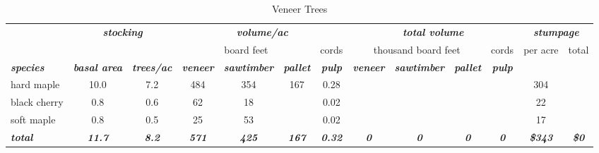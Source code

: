 \documentclass[landscape]{article}
\begin{document}
\begin{table}[H]

\caption{\label{tab:unnamed-chunk-18}Veneer Trees}
\fontsize{10}{12}\selectfont
\begin{tabular}[t]{lcccccccccccc}
\toprule
\multicolumn{1}{c}{\em{\textbf{ }}} & \multicolumn{2}{c}{\em{\textbf{stocking}}} & \multicolumn{4}{c}{\em{\textbf{volume/ac }}} & \multicolumn{4}{c}{\em{\textbf{total volume}}} & \multicolumn{2}{c}{\em{\textbf{stumpage}}} \\
\cmidrule(l{3pt}r{3pt}){2-3} \cmidrule(l{3pt}r{3pt}){4-7} \cmidrule(l{3pt}r{3pt}){8-11} \cmidrule(l{3pt}r{3pt}){12-13}
\multicolumn{3}{c}{ } & \multicolumn{3}{c}{board feet} & \multicolumn{1}{c}{cords} & \multicolumn{3}{c}{thousand board feet} & \multicolumn{1}{c}{cords} & \multicolumn{1}{c}{per acre} & \multicolumn{1}{c}{total} \\
\cmidrule(l{3pt}r{3pt}){4-6} \cmidrule(l{3pt}r{3pt}){7-7} \cmidrule(l{3pt}r{3pt}){8-10} \cmidrule(l{3pt}r{3pt}){11-11} \cmidrule(l{3pt}r{3pt}){12-12} \cmidrule(l{3pt}r{3pt}){13-13}
\rowcolor[HTML]{DCDCDC}  \em{\textbf{species}} & \em{\textbf{basal area}} & \em{\textbf{trees/ac}} & \em{\textbf{veneer}} & \em{\textbf{sawtimber}} & \em{\textbf{pallet}} & \em{\textbf{pulp}} & \em{\textbf{veneer}} & \em{\textbf{sawtimber}} & \em{\textbf{pallet}} & \em{\textbf{pulp}} & \em{\textbf{ }} & \em{\textbf{ }}\\
\midrule
\rowcolor{gray!6}  hard maple & 10.0 & 7.2 & 484 & 354 & 167 & 0.28 &  &  &  &  & 304 & \\
 
black cherry & 0.8 & 0.6 & 62 & 18 &  & 0.02 &  &  &  &  & 22 & \\
 
\rowcolor{gray!6}  soft maple & 0.8 & 0.5 & 25 & 53 &  & 0.02 &  &  &  &  & 17 & \\
 
\rowcolor[HTML]{DCDCDC}  \em{\textbf{total}} & \em{\textbf{11.7}} & \em{\textbf{8.2}} & \em{\textbf{571}} & \em{\textbf{425}} & \em{\textbf{167}} & \em{\textbf{0.32}} & \em{\textbf{0}} & \em{\textbf{0}} & \em{\textbf{0}} & \em{\textbf{0}} & \em{\textbf{\$343}} & \em{\textbf{\$0}}\\
\bottomrule
\end{tabular}
\end{table}
\end{document}
